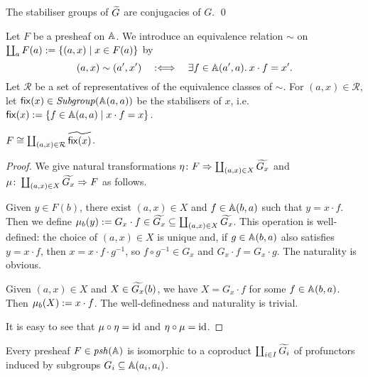 \begin{proposition}
    The stabiliser groups of \( \widetilde{G} \) are conjugacies of \( G \).
    \qed
\end{proposition}

\newcommand{\Stabiliser}{\mathsf{fix}}

Let \( F \) be a presheaf on \( \mathbb{A} \).
We introduce an equivalence relation \( \sim \) on \( \coprod_a F(a) := \{ (a, x) \mid x \in F(a) \} \) by
\begin{equation*}
    (a, x) \sim (a', x')
    \quad:\Longleftrightarrow\quad
    \exists f \in \mathbb{A}(a', a).\: x \cdot f = x'.
\end{equation*}
Let \( \mathcal{R} \) be a set of representatives of the equivalence classes of \( \sim \).
For \( (a, x) \in \mathcal{R} \), let \( \Stabiliser(x) \in \Subgroup(\Grp(a,a)) \) be the stabilisers of \( x \), i.e.~\( \Stabiliser(x) \defeq \{ f \in \Grp(a,a) \mid x \cdot f = x \} \).

\begin{proposition}
    \( F \cong \coprod_{(a,x) \in \mathcal{R}} \InducedProf{\Stabiliser(x)} \).
\end{proposition}
\begin{proof}
    We give natural transformations \( \eta \colon F \Rightarrow \coprod_{(a,x) \in X} \widetilde{G_x} \) and \( \mu \colon \coprod_{(a,x) \in X} \widetilde{G_x} \Rightarrow F \) as follows.

    Given \( y \in F(b) \), there exist \( (a,x) \in X \) and \( f \in \mathbb{A}(b,a) \) such that \( y = x \cdot f \).
    Then we define \( \mu_b(y) := G_x \cdot f \in \widetilde{G_x} \subseteq \coprod_{(a,x) \in X} \widetilde{G_x} \).
    This operation is well-defined: the choice of \( (a,x) \in X \) is unique and, if \( g \in \mathbb{A}(b,a) \) also satisfies \( y = x \cdot f \), then \( x = x \cdot f \cdot g^{-1} \), so \( f \circ g^{-1} \in G_x \) and \( G_x \cdot f = G_x \cdot g \).
    The naturality is obvious.

    Given \( (a,x) \in X \) and \( X \in \widetilde{G_x}(b) \), we have \( X = G_x \cdot f \) for some \( f \in \mathbb{A}(b,a) \).
    Then \( \mu_b(X) := x \cdot f \).
    The well-definedness and naturality is trivial.

    It is easy to see that \( \mu \circ \eta = \mathrm{id} \) and \( \eta \circ \mu = \mathrm{id} \).
\end{proof}
\begin{corollary}
    Every presheaf \( F \in \mathit{psh}(\mathbb{A}) \) is isomorphic to a coproduct \( \coprod_{i \in I} \widetilde{G_i} \) of profunctors induced by subgroups \( G_i \subseteq \mathbb{A}(a_i, a_i) \).
\end{corollary}

